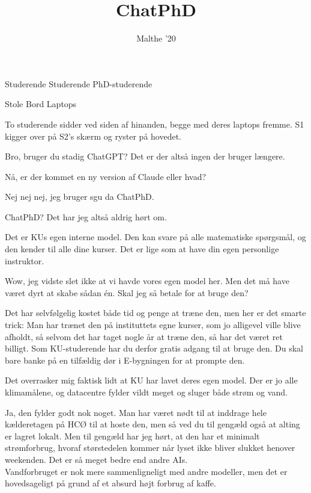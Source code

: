 \documentclass[a4paper,11pt]{article}
\title{ChatPhD}
\author{Malthe '20}
\begin{document}
\maketitle

\begin{roles}
 Studerende 
 Studerende
 PhD-studerende


\end{roles}

\begin{props}
     Stole    
     Bord
     Laptops
\end{props}


\begin{sketch}

\scene To studerende sidder ved siden af hinanden, begge med deres laptops fremme. S1 kigger over på S2's skærm og ryster på hovedet. 

 Bro, bruger du stadig ChatGPT? Det er der altså ingen der bruger længere. 

 Nå, er der kommet en ny version af Claude eller hvad?

 Nej nej nej, jeg bruger sgu da ChatPhD.

 ChatPhD? Det har jeg altså aldrig hørt om. 

 Det er KUs egen interne model. Den kan svare på alle matematiske spørgsmål, og den kender til alle dine kurser. Det er lige som at have din egen personlige instruktor.

 Wow, jeg vidste slet ikke at vi havde vores egen model her. Men det må have været dyrt at skabe sådan én. Skal jeg så betale for at bruge den?

 Det har selvfølgelig kostet både tid og penge at træne den, men her er det smarte trick: Man har trænet den på instituttets egne kurser, som jo alligevel ville blive afholdt, så selvom det har taget nogle år at træne den, så har det været ret billigt. Som KU-studerende har du derfor gratis adgang til at bruge den. Du skal bare banke på en tilfældig dør i E-bygningen for at prompte den. 

 Det overrasker mig faktisk lidt at KU har lavet deres egen model. Der er jo alle klimamålene, og datacentre fylder vildt meget og sluger både strøm og vand.

 Ja, den fylder godt nok noget. Man har været nødt til at inddrage hele kælderetagen på HCØ til at hoste den, men så ved du til gengæld også at alting er lagret lokalt. Men til gengæld har jeg hørt, at den har et minimalt strømforbrug, hvoraf størstedelen kommer når lyset ikke bliver slukket henover weekenden. Det er så meget bedre end andre AIs. \\
Vandforbruget er nok mere sammenligneligt med andre modeller, men det er hovedsageligt på grund af et absurd højt forbrug af kaffe.


\end{sketch}
\end{document}
